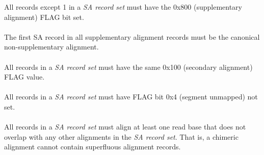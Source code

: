 \documentclass[10pt]{article}
\begin{document}
All records except 1 in a \textit{SA record set} must have the 0x800 (supplementary alignment) FLAG bit set.

\paragraph{}

The first SA record in all supplementary alignment records must be the canonical non-supplementary alignment.

\paragraph{}

All records in a \textit{SA record set} must have the same 0x100 (secondary alignment) FLAG value.

\paragraph{}

All records in a \textit{SA record set} must have FLAG bit 0x4 (segment unmapped) not set.

\paragraph{}

All records in a \textit{SA record set} must align at least one read base that does not
overlap with any other alignments in the \textit{SA record set}.
That is, a chimeric alignment cannot contain superfluous alignment records.
\end{document}
